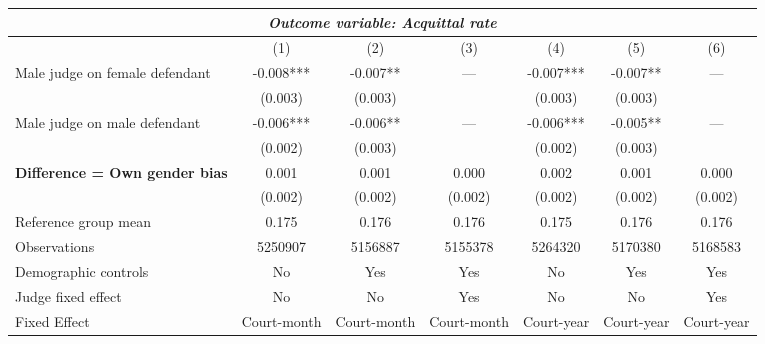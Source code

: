 {
\def\sym#1{\ifmmode^{#1}\else\(^{#1}\)\fi}
\begin{tabular}{l*{6}{c}}
  \hline\hline
\multicolumn{7}{c}{\textit{Outcome variable: Acquittal rate}}\\
\hline
&\multicolumn{1}{c}{(1)}&\multicolumn{1}{c}{(2)}&\multicolumn{1}{c}{(3)}&\multicolumn{1}{c}{(4)}&\multicolumn{1}{c}{(5)}&\multicolumn{1}{c}{(6)}\\
\hline
Male judge on female defendant \hspace{15mm} & -0.008*** & -0.007** & --- & -0.007*** & -0.007** & --- \\
& (0.003) & (0.003) &  & (0.003) &(0.003) &  \\
Male judge on male defendant \hspace{15mm} & -0.006*** & -0.006** & ---& -0.006*** & -0.005** & --- \\
& (0.002) & (0.003) &  & (0.002) & (0.003) &  \\
\textbf{Difference = Own gender bias} \hspace{15mm} & 0.001 & 0.001 & 0.000 & 0.002 & 0.001 & 0.000 \\
& (0.002) & (0.002) & (0.002) & (0.002) & (0.002) & (0.002) \\
\hline
Reference group mean & 0.175 & 0.176 & 0.176 & 0.175 & 0.176 & 0.176 \\
Observations & 5250907 & 5156887 & 5155378 & 5264320 & 5170380 & 5168583 \\
Demographic controls & No & Yes & Yes & No & Yes & Yes \\
Judge fixed effect & No & No & Yes & No & No & Yes \\
Fixed Effect & Court-month & Court-month & Court-month & Court-year & Court-year & Court-year \\
\hline\hline
\end{tabular}
}
 
